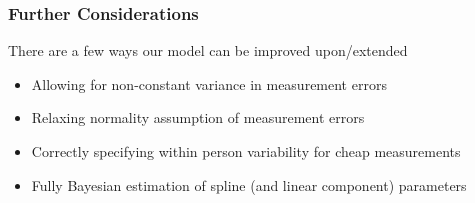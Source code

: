 \documentclass[handout]{beamer}\usepackage[]{graphicx}\usepackage[]{color}
\begin{document}
\begin{frame}
\frametitle{Further Considerations}
There are a few ways our model can be improved upon/extended

\begin{itemize}
\item
Allowing for non-constant variance in measurement errors
\item
Relaxing normality assumption of measurement errors
\item
Correctly specifying within person variability for cheap measurements
\item
Fully Bayesian estimation of spline (and linear component) parameters
\end{itemize}

\end{frame}
\end{document}

